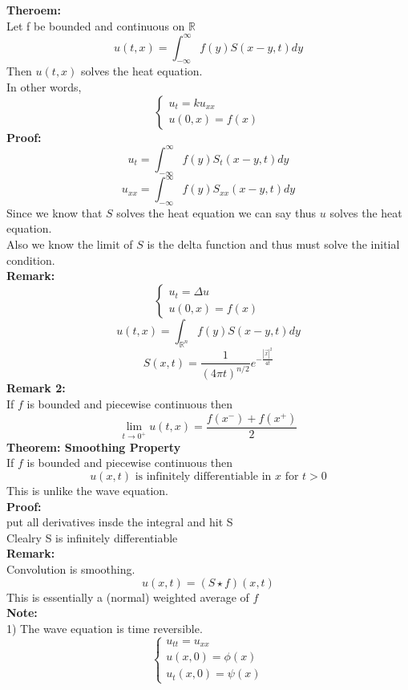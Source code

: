 \documentclass{article}
\begin{document}
\textbf{Theroem:} \\
Let f be bounded and continuous on $\mathds{R}$\\
$$u(t,x) = \int_{-\infty}^{\infty} f(y) S(x-y,t) dy$$
Then $u(t,x)$ solves the heat equation.\\
In other words,
$$\begin{cases}
    u_t = k u_{xx}\\
    u(0,x) = f(x)
\end{cases}$$
\textbf{Proof:} \\
$$u_t = \int_{-\infty}^{\infty} f(y) S_t(x-y,t) dy$$
$$u_{xx} = \int_{-\infty}^{\infty} f(y) S_{xx}(x-y,t) dy$$
Since we know that $S$ solves the heat equation we can say thus $u$ solves the heat equation.\\
Also we know the limit of $S$ is the delta function and thus must solve the initial condition.\\
\textbf{Remark:} \\
$$ \begin{cases}
    u_t = \Delta u\\
    u(0,x) = f(x)
\end{cases}
$$
$$ u(t,x) = \int_{\mathds{R}^n} f(y) S(x-y,t) dy$$
$$ S(x,t) = \frac{1}{(4\pi t)^{n/2}} e^{-\frac{|\vec{x}|^2}{4t}}$$
\textbf{Remark 2:} \\
If $f$ is bounded and piecewise continuous then \\
$$\lim_{t \to 0^+} u(t,x) = \frac{f(x^-) + f(x^+)}{2}$$
\textbf{Theorem: Smoothing Property} \\
If $f$ is bounded and piecewise continuous then \\
$$ u(x,t) \text{ is infinitely differentiable in } x \text{ for } t > 0$$
This is unlike the wave equation.\\
\textbf{Proof:} \\
put all derivatives insde the integral and hit S\\
Clealry S is infinitely differentiable \\
\textbf{Remark:} \\
Convolution is smoothing.\\
$$u(x, t) = (S \star f)(x,t)$$
This is essentially a (normal) weighted average of $f$\\
\textbf{Note:} \\
1) The wave equation is time reversible.\\
$$ \begin{cases}
    u_{tt} = u_{xx}\\
    u(x,0) = \phi(x)\\
    u_t(x,0) = \psi(x)
\end{cases}$$
\end{document}

